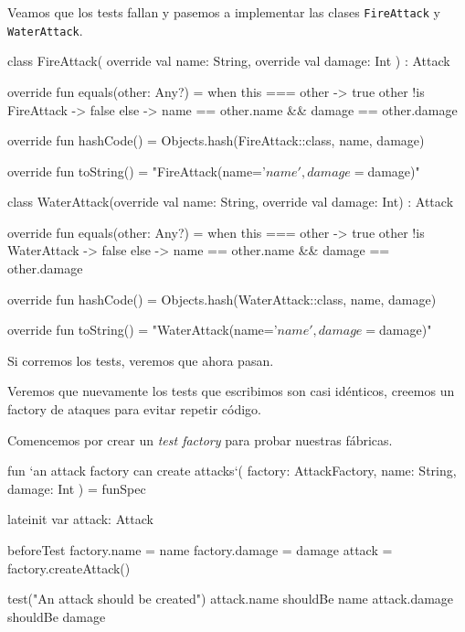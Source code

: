     Veamos que los tests fallan y pasemos a implementar las clases \texttt{FireAttack} y 
    \texttt{WaterAttack}.

    \begin{kotlin}
      class FireAttack(
        override val name: String,
        override val damage: Int
      ) : Attack {
        override fun equals(other: Any?) = when {
          this === other -> true
          other !is FireAttack -> false
          else -> name == other.name &&
              damage == other.damage
        }

        override fun hashCode() = Objects.hash(FireAttack::class, name, damage)

        override fun toString() = "FireAttack(name='$name', damage=$damage)"
      }
    \end{kotlin}

    \begin{kotlin}
      class WaterAttack(override val name: String, override val damage: Int) : Attack {
        override fun equals(other: Any?) = when {
          this === other -> true
          other !is WaterAttack -> false
          else -> name == other.name &&
                  damage == other.damage
        }

        override fun hashCode() = Objects.hash(WaterAttack::class, name, damage)

        override fun toString() = "WaterAttack(name='$name', damage=$damage)"
      }
    \end{kotlin}

    Si corremos los tests, veremos que ahora pasan.

    Veremos que nuevamente los tests que escribimos son casi idénticos, creemos un factory de ataques
    para evitar repetir código.

    Comencemos por crear un \textit{test factory} para probar nuestras fábricas.

    \begin{kotlin}
      fun `an attack factory can create attacks`(
        factory: AttackFactory,
        name: String,
        damage: Int
      ) = funSpec {
        lateinit var attack: Attack

        beforeTest {
          factory.name = name
          factory.damage = damage
          attack = factory.createAttack()
        }

        test("An attack should be created") {
          attack.name shouldBe name
          attack.damage shouldBe damage
        }
      }
    \end{kotlin}

